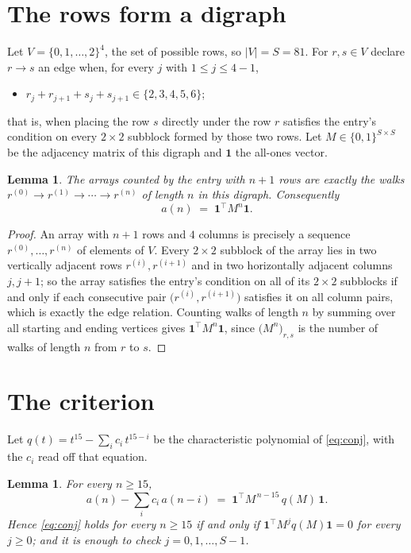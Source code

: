 \documentclass[11pt,a4paper]{article}
\theoremstyle{plain}
\newtheorem{lemma}[theorem]{Lemma}
\theoremstyle{definition}
\begin{document}
\section{The rows form a digraph}

Let $V=\{0,1,\dots,2\}^{4}$, the set of possible rows, so $|V|=S=81$. For
$r,s\in V$ declare $r\to s$ an edge when, for every $j$ with $1\le j\le 4-1$,
\begin{itemize}
\item $r_j+r_{j+1}+s_j+s_{j+1}\in\{2, 3, 4, 5, 6\}$;

\end{itemize}
that is, when placing the row $s$ directly under the row $r$ satisfies the entry's
condition on every $2\times2$ subblock formed by those two rows. Let $M\in\{0,1\}^{S\times
S}$ be the adjacency matrix of this digraph and $\mathbf{1}$ the all-ones vector.

\begin{lemma}\label{lem:walk}
The arrays counted by the entry with $n+1$ rows are exactly the walks
$r^{(0)}\to r^{(1)}\to\cdots\to r^{(n)}$ of length $n$ in this digraph. Consequently
\[
a(n)\;=\;\mathbf{1}^{\!\top}M^{n}\mathbf{1} .
\]
\end{lemma}

\begin{proof}
An array with $n+1$ rows and $4$ columns is precisely a sequence
$r^{(0)},\dots,r^{(n)}$ of elements of $V$. Every $2\times2$ subblock of the array lies
in two vertically adjacent rows $r^{(i)},r^{(i+1)}$ and in two horizontally adjacent
columns $j,j+1$; so the array satisfies the entry's condition on all of its $2\times2$
subblocks if and only if each consecutive pair $\bigl(r^{(i)},r^{(i+1)}\bigr)$ satisfies
it on all column pairs, which is exactly the edge relation. Counting walks of length $n$ by
summing over all starting and ending vertices gives
$\mathbf{1}^{\!\top}M^{n}\mathbf{1}$, since
$\bigl(M^{n}\bigr)_{r,s}$ is the number of walks of length $n$ from $r$ to $s$.
\end{proof}

\section{The criterion}

Let $q(t)=t^{15}-\sum_{i}c_i\,t^{15-i}$ be the characteristic polynomial of
\eqref{eq:conj}, with the $c_i$ read off that equation.

\begin{lemma}\label{lem:crit}
For every $n\ge15$,
\[
a(n)-\sum_i c_i\,a(n-i)\;=\;\mathbf{1}^{\!\top}M^{\,n-15}\,q(M)\,\mathbf{1} .
\]
Hence \eqref{eq:conj} holds for every $n\ge15$ if and only if
$\mathbf{1}^{\!\top}M^{j}q(M)\mathbf{1}=0$ for every $j\ge0$; and it is enough to
check $j=0,1,\dots,S-1$.
\end{lemma}
\end{document}
